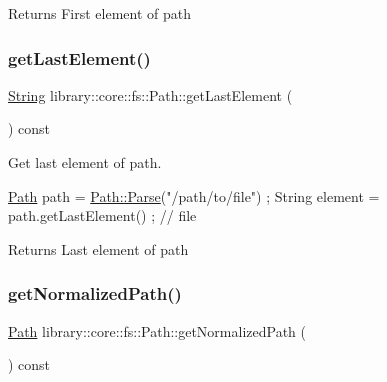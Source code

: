 \begin{DoxyReturn}{Returns}
First element of path 
\end{DoxyReturn}
\mbox{\label{classlibrary_1_1core_1_1fs_1_1_path_a1beabf215fcc96dde591838556e00370}} 
\subsubsection{\texorpdfstring{get\+Last\+Element()}{getLastElement()}}
{\footnotesize\ttfamily \hyperlink{classlibrary_1_1core_1_1types_1_1_string}{String} library\+::core\+::fs\+::\+Path\+::get\+Last\+Element (\begin{DoxyParamCaption}{ }\end{DoxyParamCaption}) const}



Get last element of path. 


\begin{DoxyCode}
\hyperlink{classlibrary_1_1core_1_1fs_1_1_path_aabc4240fc08479d1bff6b9753f2b5cc2}{Path} path = \hyperlink{classlibrary_1_1core_1_1fs_1_1_path_a6ba644b6609507e724c217bf2020f5ae}{Path::Parse}(\textcolor{stringliteral}{"/path/to/file"}) ;
String element = path.getLastElement() ; \textcolor{comment}{// file}
\end{DoxyCode}


\begin{DoxyReturn}{Returns}
Last element of path 
\end{DoxyReturn}
\mbox{\label{classlibrary_1_1core_1_1fs_1_1_path_a920b1d062cb1274da811150afafba124}} 
\subsubsection{\texorpdfstring{get\+Normalized\+Path()}{getNormalizedPath()}}
{\footnotesize\ttfamily \hyperlink{classlibrary_1_1core_1_1fs_1_1_path}{Path} library\+::core\+::fs\+::\+Path\+::get\+Normalized\+Path (\begin{DoxyParamCaption}{ }\end{DoxyParamCaption}) const}



